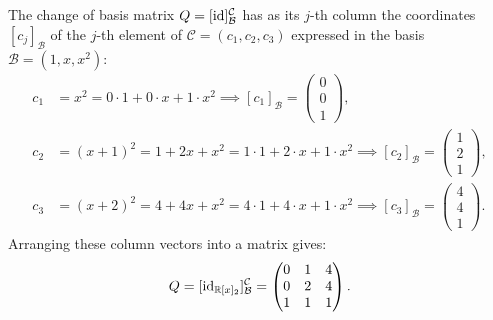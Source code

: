 \begin{exercisesolution*}
\label{sol:change_of_basis_polynomials_mc}
The change of basis matrix $Q = [\operatorname{id}]_{\mathcal{B}}^{\mathcal{C}}$ has as its $j$-th column the coordinates $[c_j]_{\mathcal{B}}$ of the $j$-th element of $\mathcal{C} = (c_1, c_2, c_3)$ expressed in the basis $\mathcal{B} = (1, x, x^2)$:
\begin{align*}
c_1 &= x^2 = 0 \cdot 1 + 0 \cdot x + 1 \cdot x^2 \implies [c_1]_{\mathcal{B}} = \begin{pmatrix} 0 \\ 0 \\ 1 \end{pmatrix}, \\
c_2 &= (x+1)^2 = 1 + 2x + x^2 = 1 \cdot 1 + 2 \cdot x + 1 \cdot x^2 \implies [c_2]_{\mathcal{B}} = \begin{pmatrix} 1 \\ 2 \\ 1 \end{pmatrix}, \\
c_3 &= (x+2)^2 = 4 + 4x + x^2 = 4 \cdot 1 + 4 \cdot x + 1 \cdot x^2 \implies [c_3]_{\mathcal{B}} = \begin{pmatrix} 4 \\ 4 \\ 1 \end{pmatrix}.
\end{align*}
Arranging these column vectors into a matrix gives:
\[
Q = [\operatorname{id}_{\mathbb{R}[x]_2}]_{\mathcal{B}}^{\mathcal{C}} = \begin{pmatrix} 0 & 1 & 4 \\ 0 & 2 & 4 \\ 1 & 1 & 1 \end{pmatrix}.
\]
\end{exercisesolution*}

